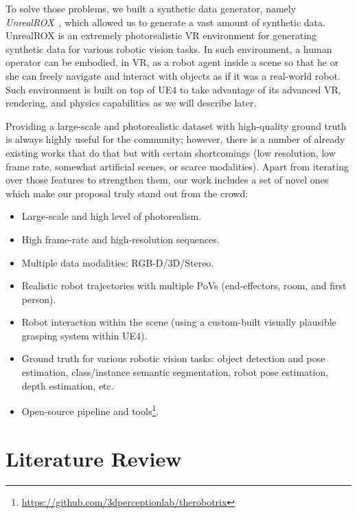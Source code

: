 To solve those problems, we built a synthetic data generator, namely \emph{UnrealROX}~\cite{Martinez-Gonzalez2018}, which allowed us to generate a vast amount of synthetic data. UnrealROX is an extremely  photorealistic \ac{VR} environment for generating synthetic data for various robotic vision tasks. In such environment, a human operator can be embodied, in \acl{VR}, as a robot agent inside a scene so that he or she can freely navigate and interact with objects as if it was a real-world robot. Such environment is built on top of \ac{UE4} to take advantage of its advanced \ac{VR}, rendering, and physics capabilities as we will describe later.

Providing a large-scale and photorealistic dataset with high-quality ground truth is always highly useful for the community; however, there is a number of already existing works that do that but with certain shortcomings (low resolution, low frame rate, somewhat artificial scenes, or scarce modalities). Apart from iterating over those features to strengthen them, our work includes a set of novel ones which make our proposal truly stand out from the crowd:

\begin{itemize}
    \item Large-scale and high level of photorealism.
    \item High frame-rate and high-resolution sequences.
    \item Multiple data modalities: RGB-D/3D/Stereo.
	\item Realistic robot trajectories with multiple \acsp{PoV} (end-effectors, room, and first person).
	\item Robot interaction within the scene (using a custom-built visually plausible grasping system within \ac{UE4}).
    \item Ground truth for various robotic vision tasks: object detection and pose estimation, class/instance semantic segmentation, robot pose estimation, depth estimation, etc.
    \item Open-source pipeline and tools\footnote{\url{https://github.com/3dperceptionlab/therobotrix}}.
\end{itemize}

\clearpage

\section{Literature Review}
\label{cha:sim2real:sec:related_works}

